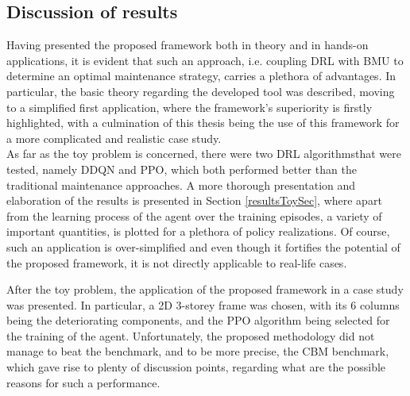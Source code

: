 
\subsection{Discussion of results}

Having presented the proposed framework both in theory and in hands-on applications, it is evident that such an approach, i.e. coupling \gls{DRL} with \gls{BMU} to determine an optimal maintenance strategy, carries a plethora of advantages. In particular, the basic theory regarding the developed tool was described, moving to a simplified first application, where the framework's superiority is firstly highlighted, with a culmination of this thesis being the use of this framework for a more complicated and realistic case study.\\

As far as the toy problem is concerned, there were two \gls{DRL} algorithms\footnotemark that were tested, namely \gls{DDQN} and \gls{PPO}, which both performed better than the traditional maintenance approaches. A more thorough presentation and elaboration of the results is presented in Section \ref{resultsToySec}, where apart from the learning process of the agent over the training episodes, a variety of important quantities,  is plotted for a plethora of policy realizations. Of course, such an application is over-simplified and even though it fortifies the potential of the proposed framework, it is not directly applicable to real-life cases. \\


After the toy problem, the application of the proposed framework in a case study was presented. In particular, a 2D 3-storey frame was chosen, with its 6 columns being the deteriorating components, and the \gls{PPO} algorithm being selected for the training of the agent. Unfortunately, the proposed methodology did not manage to beat the benchmark, and to be more precise, the \gls{CBM} benchmark, which gave rise to plenty of discussion points, regarding what are the possible reasons for such a performance.\\


